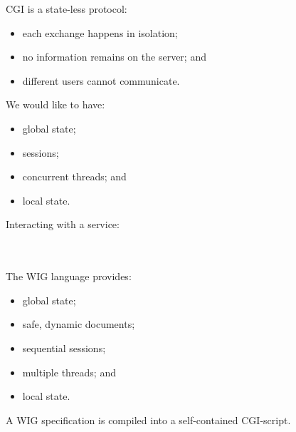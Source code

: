 \begin{slide*}
CGI is a state-less protocol:
\begin{itemize}
\item each exchange happens in isolation;
\item no information remains on the server; and
\item different users cannot communicate.
\end{itemize}
\vspace*{2ex}

We would like to have:
\begin{itemize}
\item global state;
\item sessions;
\item concurrent threads; and
\item local state.
\end{itemize}

\vfil
\end{slide*}
 
\begin{slide*}
Interacting with a service:\\

\\
\\
\vfil
\end{slide*}
 
\begin{slide*}
\vfil
\end{slide*}
 
\begin{slide*}
The WIG language provides:

\begin{itemize}
\item global state;
\item safe, dynamic documents;
\item sequential sessions;
\item multiple threads; and
\item local state.
\end{itemize}
\vspace*{2ex}

A WIG specification is compiled into a self-contained CGI-script.
\vfil
\end{slide*}

